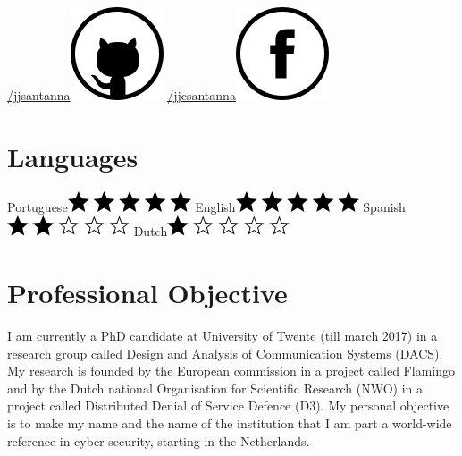 \documentclass[print]{friggeri-cv-linux} %
\begin{document}
\begin{aside}
\href{https://github.com/jjsantanna}{/jjsantanna\includegraphics[scale=0.3]{img/github.png}}
\href{https://www.facebook.com/jjcsantanna}{/jjcsantanna}\includegraphics[scale=0.3]{img/facebook.png}
~
\section{Languages}
Portuguese\includegraphics[scale=0.40]{img/5stars.png}
English\includegraphics[scale=0.40]{img/5stars.png}
Spanish\includegraphics[scale=0.40]{img/2stars.png}
Dutch\includegraphics[scale=0.40]{img/1star.png}
\end{aside}

\section{Professional Objective}
I am currently a PhD candidate at University of Twente (till march 2017) in a
research group called Design and Analysis of Communication Systems (DACS). My
research is founded by the European commission in a project called Flamingo and
by the Dutch national Organisation for Scientific Research (NWO) in a project
called Distributed Denial of Service Defence (D3). My personal objective is to
make my name and the name of the institution that I am part a world-wide
reference in cyber-security, starting in the Netherlands. 
\end{document}
